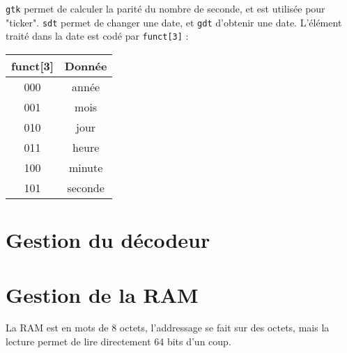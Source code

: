 \documentclass{article}
\begin{document}
\texttt{gtk} permet de calculer la parité du nombre de seconde, et est utilisée pour "ticker". \texttt{sdt} permet de changer une date, et \texttt{gdt} d'obtenir une date. L'élément traité dans la date est codé par \texttt{funct[3]} : 

\begin{table}[h!]
\centering
\begin{tabular}{|c|c|}
\hline
\textbf{funct[3]} & \textbf{Donnée} \\
\hline
000   & année \\
001  & mois \\
010  & jour \\
011  & heure \\
100  & minute \\
101  & seconde  \\
\hline
\end{tabular}
\end{table}






\section{Gestion du décodeur}



\section{Gestion de la RAM}

La RAM est en mots de 8 octets, l'addressage se fait sur des octets, mais la lecture permet de lire directement 64 bits d'un coup. 
\end{document}

